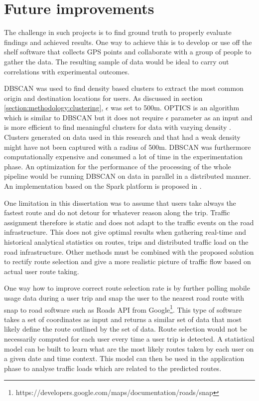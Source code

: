 \documentclass[12pt, a4paper]{report}
\theoremstyle{definition}
\theoremstyle{definition}%
\theoremstyle{definition}%
\theoremstyle{definition}%
\theoremstyle{definition}%
\theoremstyle{definition}%
\begin{document}
\section{Future improvements} \label{section:future_improvements}


The challenge in such projects is to find ground truth to properly evaluate findings and achieved results. One way to achieve this is to develop or use off the shelf software that collects GPS points and collaborate with a group of people to gather the data. The resulting sample of data would be ideal to carry out correlations with experimental outcomes.

DBSCAN was used to find density based clusters to extract the most common origin and destination locations for users. As discussed in section \ref{section:methodology:clustering}, $\epsilon$ was set to 500m. OPTICS is an algorithm which is similar to DBSCAN but it does not require $\epsilon$ parameter as an input and is more efficient to find meaningful clusters for data with varying density \cite{Ankerst1999}. Clusters generated on data used in this research and that had a weak density might have not been captured with a radius of 500m. DBSCAN was furthermore computationally expensive and consumed a lot of time in the experimentation phase. An optimization for the performance of the processing of the whole pipeline would be running DBSCAN on data in parallel in a distributed manner. An implementation based on the Spark platform is proposed in \cite{huang2017research}.

One limitation in this dissertation was to assume that users take always the fastest route and do not detour for whatever reason along the trip. Traffic assignment therefore is static and does not adapt to the traffic events on the road infrastructure. This does not give optimal results when gathering real-time and historical analytical statistics on routes, trips and distributed traffic load on the road infrastructure. Other methods must be combined with the proposed solution to rectify route selection and give a more realistic picture of traffic flow based on actual user route taking. 

One way how to improve correct route selection rate is by further polling mobile usage data during a user trip and snap the user to the nearest road route with snap to road software such as Roads API from Google\footnote{https://developers.google.com/maps/documentation/roads/snap}. This type of software takes a set of coordinates as input and returns a similar set of data that most likely define the route outlined by the set of data. Route selection would not be necessarily computed for each user every time a user trip is detected. A statistical model can be built to learn what are the most likely routes taken by each user on a given date and time context. This model can then be used in the application phase to analyse traffic loads which are related to the predicted routes.
\end{document}
